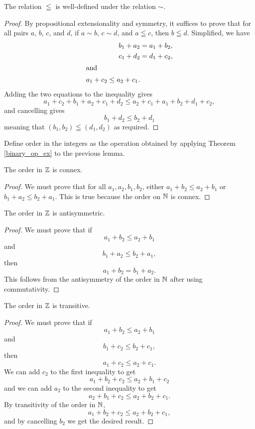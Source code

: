 \documentclass[../../math.tex]{subfiles}
\begin{document}
\begin{theorem}
    The relation $\leqq$ is well-defined under the relation $\sim$.
\end{theorem}
\begin{proof}
    By propositional extensionality and symmetry, it suffices to prove that for
    all pairs $a$, $b$, $c$, and $d$, if $a \sim b$, $c \sim d$, and $a \leqq
    c$, then $b \leqq d$.  Simplified, we have
    \begin{align*}
        b_1 + a_2 &= a_1 + b_2, \\
        c_1 + d_2 &= d_1 + c_2, \\
    \intertext{and}
        a_1 + c_2 \leq a_2 + c_1.
    \end{align*}
    Adding the two equations to the inequality gives
    \[
       a_1 + c_2 + b_1 + a_2 + c_1 + d_2 \leq a_2 + c_1 + a_1 + b_2 + d_1 + c_2,
    \]
    and cancelling gives
    \[
        b_1 + d_2 \leq b_2 + d_1
    \]
    meaning that $(b_1, b_2) \leqq (d_1, d_2)$ as required.
\end{proof}

\begin{instance}
    Define order in the integers as the operation obtained by applying Theorem
    \ref{binary_op_ex} to the previous lemma.
\end{instance}

\begin{instance}
    The order in $\mathbb{Z}$ is connex.
\end{instance}
\begin{proof}
    We must prove that for all $a_1, a_2, b_1, b_2$, either $a_1 + b_2 \leq a_2
    + b_1$ or $b_1 + a_2 \leq b_2 + a_1$.  This is true because the order on
    $\mathbb{N}$ is connex.
\end{proof}

\begin{instance}
    The order in $\mathbb{Z}$ is antisymmetric.
\end{instance}
\begin{proof}
    We must prove that if
    \[
        a_1 + b_2 \leq a_2 + b_1
    \]
    and
    \[
        b_1 + a_2 \leq b_2 + a_1,
    \]
    then
    \[
        a_1 + b_2 = b_1 + a_2.
    \]
    This follows from the antisymmetry of the order in $\mathbb{N}$ after using
    commutativity.
\end{proof}

\begin{instance}
    The order in $\mathbb{Z}$ is transitive.
\end{instance}
\begin{proof}
    We must prove that if
    \[
        a_1 + b_2 \leq a_2 + b_1
    \]
    and
    \[
        b_1 + c_2 \leq b_2 + c_1,
    \]
    then
    \[
        a_1 + c_2 \leq a_2 + c_1.
    \]
    We can add $c_2$ to the first inequality to get
    \[
        a_1 + b_2 + c_2 \leq a_2 + b_1 + c_2
    \]
    and we can add $a_2$ to the second inequality to get
    \[
        a_2 + b_1 + c_2 \leq a_2 + b_2 + c_1.
    \]
    By transitivity of the order in $\mathbb{N}$,
    \[
        a_1 + b_2 + c_2 \leq a_2 + b_2 + c_1,
    \]
    and by cancelling $b_2$ we get the desired result.
\end{proof}
\end{document}
